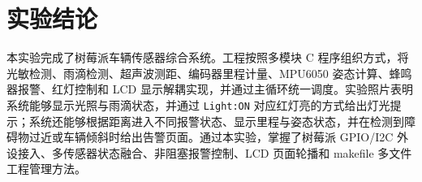 \documentclass[UTF8,a4paper,12pt]{ctexart}
\begin{document}
\section{实验结论}

本实验完成了树莓派车辆传感器综合系统。工程按照多模块 C 程序组织方式，将光敏检测、雨滴检测、超声波测距、编码器里程计量、MPU6050 姿态计算、蜂鸣器报警、红灯控制和 LCD 显示解耦实现，并通过主循环统一调度。实验照片表明系统能够显示光照与雨滴状态，并通过 \texttt{Light:ON} 对应红灯亮的方式给出灯光提示；系统还能够根据距离进入不同报警状态、显示里程与姿态状态，并在检测到障碍物过近或车辆倾斜时给出告警页面。通过本实验，掌握了树莓派 GPIO/I2C 外设接入、多传感器状态融合、非阻塞报警控制、LCD 页面轮播和 makefile 多文件工程管理方法。
\end{document}
